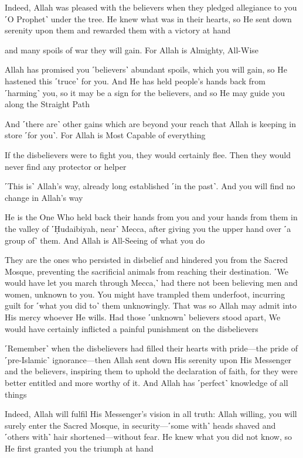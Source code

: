 Indeed, Allah was pleased with the believers when they pledged allegiance to you ˹O Prophet˺ under the tree. He knew what was in their hearts, so He sent down serenity upon them and rewarded them with a victory at hand

and many spoils of war they will gain. For Allah is Almighty, All-Wise

Allah has promised you ˹believers˺ abundant spoils, which you will gain, so He hastened this ˹truce˺ for you. And He has held people’s hands back from ˹harming˺ you, so it may be a sign for the believers, and so He may guide you along the Straight Path

And ˹there are˺ other gains which are beyond your reach that Allah is keeping in store ˹for you˺. For Allah is Most Capable of everything

If the disbelievers were to fight you, they would certainly flee. Then they would never find any protector or helper

˹This is˺ Allah’s way, already long established ˹in the past˺. And you will find no change in Allah’s way

He is the One Who held back their hands from you and your hands from them in the valley of ˹Ḥudaibiyah, near˺ Mecca, after giving you the upper hand over ˹a group of˺ them. And Allah is All-Seeing of what you do

They are the ones who persisted in disbelief and hindered you from the Sacred Mosque, preventing the sacrificial animals from reaching their destination. ˹We would have let you march through Mecca,˺ had there not been believing men and women, unknown to you. You might have trampled them underfoot, incurring guilt for ˹what you did to˺ them unknowingly. That was so Allah may admit into His mercy whoever He wills. Had those ˹unknown˺ believers stood apart, We would have certainly inflicted a painful punishment on the disbelievers

˹Remember˺ when the disbelievers had filled their hearts with pride—the pride of ˹pre-Islamic˺ ignorance—then Allah sent down His serenity upon His Messenger and the believers, inspiring them to uphold the declaration of faith, for they were better entitled and more worthy of it. And Allah has ˹perfect˺ knowledge of all things

Indeed, Allah will fulfil His Messenger’s vision in all truth: Allah willing, you will surely enter the Sacred Mosque, in security—˹some with˺ heads shaved and ˹others with˺ hair shortened—without fear. He knew what you did not know, so He first granted you the triumph at hand

